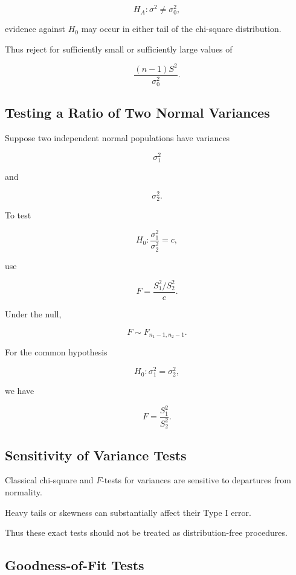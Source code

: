 \[
H_A:\sigma^2\neq\sigma_0^2,
\]

evidence against \(H_0\) may occur in either tail of the chi-square
distribution.

Thus reject for sufficiently small or sufficiently large values of

\[
\frac{
(n-1)S^2
}{
\sigma_0^2
}.
\]

\subsection{Testing a Ratio of Two Normal Variances}
\label{subsec:test-ratio-variances}

Suppose two independent normal populations have variances

\[
\sigma_1^2
\]

and

\[
\sigma_2^2.
\]

To test

\[
H_0:
\frac{
\sigma_1^2
}{
\sigma_2^2
}
=
c,
\]

use

\[
\boxed{
F
=
\frac{
S_1^2/S_2^2
}{
c
}.
}
\]

Under the null,

\[
\boxed{
F
\sim
F_{n_1-1,n_2-1}.
}
\]

For the common hypothesis

\[
H_0:\sigma_1^2=\sigma_2^2,
\]

we have

\[
\boxed{
F
=
\frac{
S_1^2
}{
S_2^2
}.
}
\]

\subsection{Sensitivity of Variance Tests}
\label{subsec:variance-tests-normality}

Classical chi-square and \(F\)-tests for variances are sensitive to
departures from normality.

Heavy tails or skewness can substantially affect their Type I error.

Thus these exact tests should not be treated as distribution-free
procedures.

\subsection{Goodness-of-Fit Tests}
\label{subsec:goodness-of-fit-tests}

